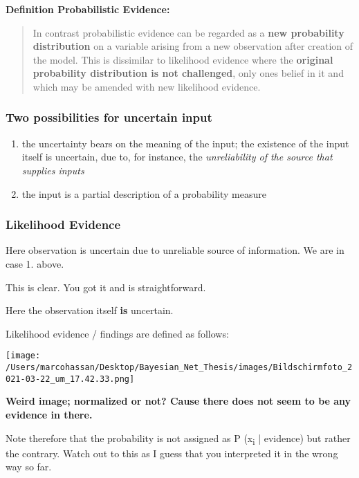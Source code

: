 \documentclass[a4paper]{article}
\begin{document}
\textbf{Definition Probabilistic Evidence:}

\begin{quote}
In contrast probabilistic evidence can be regarded as a \textbf{new
probability distribution} on a variable arising from a new
observation after creation of the model. This is dissimilar to
likelihood evidence where the \textbf{original probability distribution is
not challenged}, only ones belief in it and which may be amended
with new likelihood evidence.
\end{quote}


\subsubsection{Two possibilities for uncertain input}
\label{sec:orge54378f}

\begin{enumerate}
\item the uncertainty bears on the meaning of the input; the
existence of the input itself is uncertain, due to, for
instance, the \emph{unreliability of the source that supplies
inputs}

\item the input is a partial description of a probability measure
\end{enumerate}


\subsubsection{Likelihood Evidence}
\label{sec:org1a7cef8}

Here observation is uncertain due to unreliable source of
information. We are in case 1. above.

This is clear. You got it and is straightforward.

Here the observation itself \textbf{is} uncertain.

Likelihood evidence / findings are defined as follows:

\begin{center}
\texttt{[image: /Users/marcohassan/Desktop/Bayesian\_Net\_Thesis/images/Bildschirmfoto\_2021-03-22\_um\_17.42.33.png]}
\end{center}


\textbf{Weird image; normalized or not? Cause there does not seem to be
any evidence in there.}

Note therefore that the probability is not assigned as P (x\textsubscript{i} |
evidence) but rather the contrary. Watch out to this as I guess
that you interpreted it in the wrong way so far.
\end{document}
